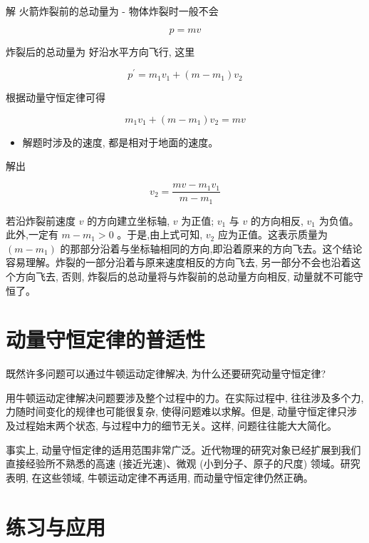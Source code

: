 \documentclass[10pt]{article}
\begin{document}
解 火箭炸裂前的总动量为 - 物体炸裂时一般不会

\[
p = {mv} \tag{正好分成两块, 也不会正}
\]

炸裂后的总动量为 好沿水平方向飞行, 这里

\[
{p}^{\prime } = {m}_{1}{v}_{1} + \left( {m - {m}_{1}}\right) {v}_{2} \tag{对问题进行了简化处理。}
\]

根据动量守恒定律可得

\[
{m}_{1}{v}_{1} + \left( {m - {m}_{1}}\right) {v}_{2} = {mv}
\]

\begin{mdframed}

\begin{itemize}
\item 解题时涉及的速度, 都是相对于地面的速度。
\end{itemize}

\end{mdframed}

解出

\[
{v}_{2} = \frac{{mv} - {m}_{1}{v}_{1}}{m - {m}_{1}}
\]

若沿炸裂前速度 \(v\) 的方向建立坐标轴, \(v\) 为正值; \({v}_{1}\) 与 \(v\) 的方向相反, \({v}_{1}\) 为负值。此外,一定有 \(m - {m}_{1} > 0\) 。于是,由上式可知, \({v}_{2}\) 应为正值。这表示质量为 \(\left( {m - {m}_{1}}\right)\) 的那部分沿着与坐标轴相同的方向,即沿着原来的方向飞去。这个结论容易理解。炸裂的一部分沿着与原来速度相反的方向飞去, 另一部分不会也沿着这个方向飞去, 否则, 炸裂后的总动量将与炸裂前的总动量方向相反, 动量就不可能守恒了。

\section*{动量守恒定律的普适性}

既然许多问题可以通过牛顿运动定律解决, 为什么还要研究动量守恒定律?

用牛顿运动定律解决问题要涉及整个过程中的力。在实际过程中, 往往涉及多个力, 力随时间变化的规律也可能很复杂, 使得问题难以求解。但是, 动量守恒定律只涉及过程始末两个状态, 与过程中力的细节无关。这样, 问题往往能大大简化。

事实上, 动量守恒定律的适用范围非常广泛。近代物理的研究对象已经扩展到我们直接经验所不熟悉的高速 (接近光速)、微观 (小到分子、原子的尺度) 领域。研究表明, 在这些领域, 牛顿运动定律不再适用, 而动量守恒定律仍然正确。

\section*{练习与应用}
\end{document}
